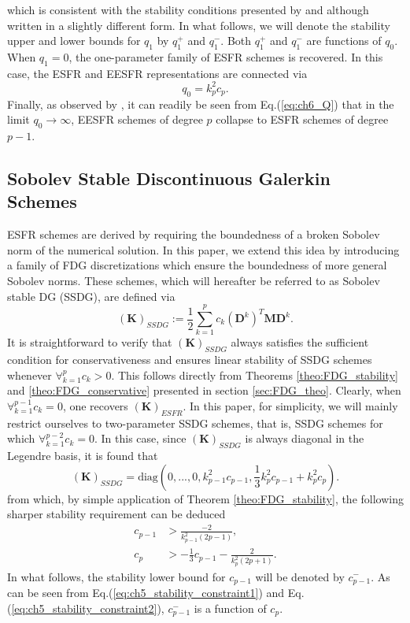 \documentclass[preprint,12pt]{elsarticle}
\begin{document}
which is consistent with the stability conditions presented by \cite{vincent2015extended} and \cite{vermeire2016properties} although written in a slightly different form. In what follows, we will denote the stability upper and lower bounds for $q_1$ by $q_1^+$ and $q_1^{-}$. Both $q_1^+$ and $q_1^-$ are functions of $q_0$. When $q_1=0$, the one-parameter family of ESFR schemes is recovered. In this case, the ESFR and EESFR representations are connected via
\begin{equation}
    q_0 = k_p^2 c_p.
    \label{eq:param_scale}
\end{equation}
Finally, as observed by \cite{vermeire2016properties}, it can readily be seen from Eq.(\ref{eq:ch6_Q}) that in the limit $q_0 \to \infty$, EESFR schemes of degree $p$ collapse to ESFR schemes of degree $p-1$.

\subsection{Sobolev Stable Discontinuous Galerkin Schemes}
ESFR schemes are derived by requiring the boundedness of a broken Sobolev norm of the numerical solution. In this paper, we extend this idea by introducing a family of FDG discretizations which ensure the boundedness of more general Sobolev norms. These schemes, which will hereafter be referred to as Sobolev stable DG (SSDG), are defined via
\begin{equation}
    (\mathbf{K})_{SSDG} := \frac{1}{2} \sum_{k=1}^p c_k(\mathbf{D}^k)^T \mathbf{M} \mathbf{D}^k.
    \label{eq:SSDG}
\end{equation}
It is straightforward to verify that $(\mathbf{K})_{SSDG}$ always satisfies the sufficient condition for conservativeness and ensures linear stability of SSDG schemes whenever $\forall_{k=1}^{p} c_k > 0$. This follows directly from Theorems \ref{theo:FDG_stability} and \ref{theo:FDG_conservative}  presented in section \ref{sec:FDG_theo}. Clearly, when $\forall_{k=1}^{p-1}c_k=0$, one recovers $(\mathbf{K})_{ESFR}$. In this paper, for simplicity, we will mainly restrict ourselves to two-parameter SSDG schemes, that is, SSDG schemes for which $\forall_{k=1}^{p-2}c_k = 0$. In this case, since $(\mathbf{K})_{SSDG}$ is always diagonal in the Legendre basis, it is found that
\begin{equation}
    (\mathbf{K})_{SSDG} =
    \text{diag}\left(0,...,0, k_{p-1}^2c_{p-1}, \frac{1}{3}k_{p}^2c_{p-1} + k_{p}^2c_p\right).
    \label{eq:ch5_K}
\end{equation}
from which, by simple application of Theorem \ref{theo:FDG_stability}, the following sharper stability requirement can be deduced
\begin{align}
    c_{p-1} &> \frac{-2}{k_{p-1}^2(2p-1)}, \label{eq:ch5_stability_constraint1} \\
    c_p &> -\frac{1}{3}c_{p-1} - \frac{2}{k_p^2(2p+1)}. \label{eq:ch5_stability_constraint2}
\end{align}
In what follows, the stability lower bound for $c_{p-1}$ will be denoted by $c_{p-1}^-$. As can be seen from Eq.(\ref{eq:ch5_stability_constraint1}) and Eq.(\ref{eq:ch5_stability_constraint2}), $c_{p-1}^-$ is a function of $c_p$.
\end{document}
